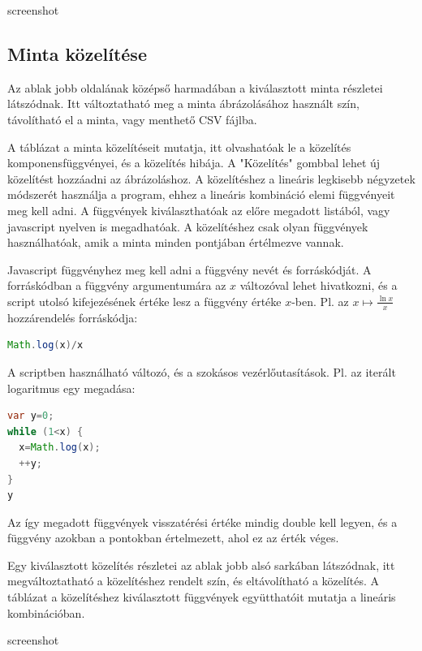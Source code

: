 \documentclass[12pt]{report}
\begin{document}
{\color{red}screenshot}

\subsection{Minta közelítése}

Az ablak jobb oldalának középső harmadában a kiválasztott minta részletei látszódnak.
Itt változtatható meg a minta ábrázolásához használt szín, távolítható el a minta,
vagy menthető CSV fájlba.

A táblázat a minta közelítéseit mutatja,
itt olvashatóak le a közelítés komponensfüggvényei, és a közelítés hibája.
A "Közelítés" gombbal lehet új közelítést hozzáadni az ábrázoláshoz.
A közelítéshez a lineáris legkisebb négyzetek módszerét használja a program,
ehhez a lineáris kombináció elemi függvényeit meg kell adni.
A függvények kiválaszthatóak az előre megadott listából,
vagy javascript nyelven is megadhatóak.
A közelítéshez csak olyan függvények használhatóak, amik a minta
minden pontjában értélmezve vannak.

Javascript függvényhez meg kell adni a függvény nevét és forráskódját.
A forráskódban a függvény argumentumára az $x$ változóval lehet hivatkozni,
és a script utolsó kifejezésének értéke lesz a függvény
értéke $x$-ben. Pl. az $x \mapsto \frac{\ln{x}}{x}$ hozzárendelés
forráskódja:

{\small
\begin{lstlisting}[language=Java]
Math.log(x)/x
\end{lstlisting}
}

A scriptben használható változó, és a szokásos vezérlőutasítások.
Pl. az iterált logaritmus egy megadása:
{\small
\begin{lstlisting}[language=Java]
var y=0;
while (1<x) {
  x=Math.log(x);
  ++y;
}
y
\end{lstlisting}
}

Az így megadott függvények visszatérési értéke mindig double kell legyen,
és a függvény azokban a pontokban értelmezett, ahol ez az érték véges.

Egy kiválasztott közelítés részletei az ablak jobb alsó sarkában látszódnak,
itt megváltoztatható a közelítéshez rendelt szín, és eltávolítható a közelítés.
A táblázat a közelítéshez kiválasztott függvények együtthatóit mutatja
a lineáris kombinációban.

{\color{red}screenshot}
\end{document}
